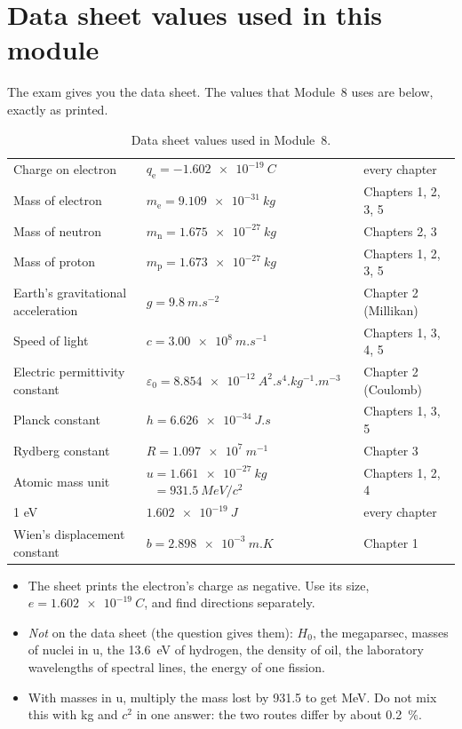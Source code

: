 \section*{Data sheet values used in this module}
The exam gives you the data sheet. The values that Module~8 uses are below, exactly as
printed.

\begin{table}
  \caption*{Data sheet values used in Module~8.}
  \centering
  \small
  \begin{tabular}{@{}L{48mm}L{58mm}L{33mm}@{}}
    \toprule
     &  & \\
    \midrule
    Charge on electron & $q_\mathrm{e} = \qty{-1.602e-19}{C}$ & every chapter\\
    Mass of electron & $m_\mathrm{e} = \qty{9.109e-31}{kg}$ & Chapters 1, 2, 3, 5\\
    Mass of neutron & $m_\mathrm{n} = \qty{1.675e-27}{kg}$ & Chapters 2, 3\\
    Mass of proton & $m_\mathrm{p} = \qty{1.673e-27}{kg}$ & Chapters 1, 2, 3, 5\\
    Earth's gravitational acceleration & $g = \qty{9.8}{m.s^{-2}}$ & Chapter 2 (Millikan)\\
    Speed of light & $c = \qty{3.00e8}{m.s^{-1}}$ & Chapters 1, 3, 4, 5\\
    Electric permittivity constant & $\varepsilon_0 = \qty{8.854e-12}{A^2.s^4.kg^{-1}.m^{-3}}$
      & Chapter 2 (Coulomb)\\
    Planck constant & $h = \qty{6.626e-34}{J.s}$ & Chapters 1, 3, 5\\
    Rydberg constant & $R = \qty{1.097e7}{m^{-1}}$ & Chapter 3\\
    Atomic mass unit & $u = \qty{1.661e-27}{kg}$\newline $\phantom{u} = \qty{931.5}{MeV}/c^2$
      & Chapters 1, 2, 4\\
    1 eV & $\qty{1.602e-19}{J}$ & every chapter\\
    Wien's displacement constant & $b = \qty{2.898e-3}{m.K}$ & Chapter 1\\
    \bottomrule
  \end{tabular}
\end{table}

\begin{itemize}
  \item The sheet prints the electron's charge as negative. Use its size,
        $e = \qty{1.602e-19}{C}$, and find directions separately.
  \item \emph{Not} on the data sheet (the question gives them): $H_0$, the megaparsec,
        masses of nuclei in u, the \qty{13.6}{eV} of hydrogen, the density of oil, the
        laboratory wavelengths of spectral lines, the energy of one fission.
  \item With masses in u, multiply the mass lost by 931.5 to get MeV. Do not mix this with
        kg and $c^2$ in one answer: the two routes differ by about \qty{0.2}{\percent}.
\end{itemize}

